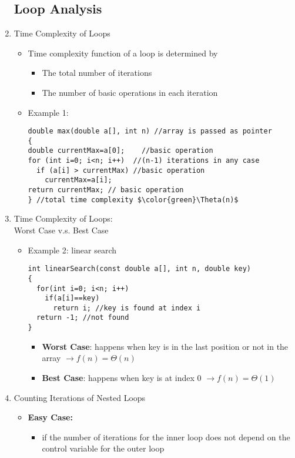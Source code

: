 \begin{enumerate}
\subsection{Loop Analysis}
\item Time Complexity of Loops
  \begin{itemize}
  \item Time complexity function of a loop is determined by
    \begin{itemize}
    \item The total number of iterations
    \item The number of basic operations in each iteration
    \end{itemize}
  \item Example 1:
\begin{lstlisting}[mathescape=true]
double max(double a[], int n) //array is passed as pointer
{
double currentMax=a[0];    //basic operation
for (int i=0; i<n; i++)  //(n-1) iterations in any case
  if (a[i] > currentMax) //basic operation
    currentMax=a[i];
return currentMax; // basic operation
} //total time complexity $\color{green}\Theta(n)$
\end{lstlisting}
  \end{itemize}
\item Time Complexity of Loops: \\
      Worst Case v.s. Best Case
  \begin{itemize}
  \item Example 2: linear search 
\begin{lstlisting}
int linearSearch(const double a[], int n, double key)
{
  for(int i=0; i<n; i++)
    if(a[i]==key)
      return i; //key is found at index i
  return -1; //not found
}
\end{lstlisting}
    \begin{itemize} 
    \item \textbf{Worst Case}: happens when key is in the last position or not in the array $\rightarrow f(n)=\Theta(n)$
    \item \textbf{Best Case}: happens when key is at index 0 $\rightarrow f(n)=\Theta(1)$
    \end{itemize}
  \end{itemize}
\item Counting Iterations of Nested Loops
  \begin{itemize}
  \item \textbf{Easy Case:}
    \begin{itemize}
    \item if the number of iterations for the inner loop does not depend on the control variable for the outer loop

\end{itemize}
\end{itemize}
\end{enumerate}

